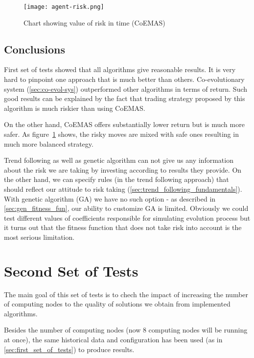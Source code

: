 \begin{figure}[ht]
  \begin{center}
    \texttt{[image: agent-risk.png]}
  \end{center}
  \caption{Chart showing value of risk in time (CoEMAS)}
  \label{fig:agent_risk}
\end{figure}

\subsection{Conclusions}

First set of tests showed that all algorithms give reasonable results.
It is very hard to pinpoint one approach that is much better than others.
Co-evolutionary system (\ref{sec:co-evol-sys}) outperformed other algorithms in terms of return.
Such good results can be explained by the fact that trading strategy proposed by this algorithm is much riskier than using CoEMAS.
  
On the other hand, CoEMAS offers substantially lower return but is much more safer.
As figure~\ref{fig:agent_risk} shows, the risky moves are mixed with safe ones resulting in much more balanced strategy.

Trend following as well as genetic algorithm can not give us any information about the risk we are taking by investing according to results they provide.
On the other hand, we can specify rules (in the trend following approach) that should reflect our attitude to risk taking (\ref{sec:trend_following_fundamentals}).
With genetic algorithm (GA) we have no such option - as described in \ref{sec:gen_fitness_fun}, our ability to customize GA is limited.
Obviously we could test different values of coefficients responsible for simulating evolution process but it turns out that the fitness function that does not take risk into
account is the most serious limitation.


\section{Second Set of Tests}

The main goal of this set of tests is to chech the impact of increasing the number of computing nodes to the quality of solutions we obtain from implemented algorithms.

Besides the number of computing nodes (now 8 computing nodes will be running at once), the same historical data and configuration has been
 used (as in \ref{sec:first_set_of_tests}) to produce results.



